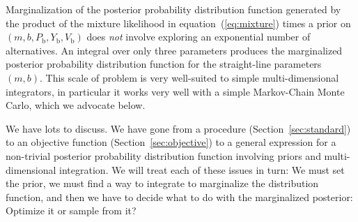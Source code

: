 \documentclass[12pt,twoside]{article}
\newcommand{\sectionname}{Section}
\newcommand{\equationname}{equation}
\newcounter{problem}
\newcommand{\Pbad}{P_{\mathrm{b}}}
\newcommand{\Ybad}{Y_{\mathrm{b}}}
\newcommand{\Vbad}{V_{\mathrm{b}}}
\begin{document}
Marginalization of the posterior probability distribution function
generated by the product of the mixture likelihood in
\equationname~(\ref{eq:mixture}) times a prior on
$(m,b,\Pbad,\Ybad,\Vbad)$ does \emph{not} involve exploring an
exponential number of alternatives.  An integral over only three
parameters produces the marginalized posterior probability
distribution function for the straight-line parameters $(m,b)$.  This
scale of problem is very well-suited to simple multi-dimensional
integrators, in particular it works very well with a simple
Markov-Chain Monte Carlo, which we advocate below.

We have lots to discuss.  We have gone from a procedure
(\sectionname~\ref{sec:standard}) to an objective function
(\sectionname~\ref{sec:objective}) to a general expression for a
non-trivial posterior probability distribution function involving
priors and multi-dimensional integration.  We will treat each of
these issues in turn: We must set the prior, we must find a way to
integrate to marginalize the distribution function, and then we have
to decide what to do with the marginalized posterior: Optimize it or
sample from it?
\end{document}
